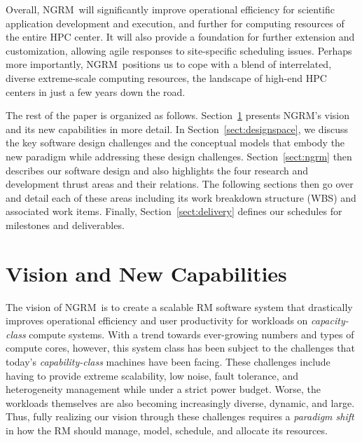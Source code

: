 \documentclass[10pt]{article}
\newcommand{\ngrm}{NGRM}
\begin{document}
Overall, \ngrm\ will significantly improve operational efficiency for
scientific application development and execution, and further for computing
resources of the entire HPC center.  It will also provide
a foundation for further extension and customization, allowing agile responses
to site-specific scheduling issues. Perhaps more importantly, \ngrm\
positions us to cope with a blend of interrelated, diverse
extreme-scale computing resources, the landscape of high-end HPC centers
in just a few years down the road.

The rest of the paper is organized as follows.
Section~\ref{sect:vision} presents \ngrm's vision and 
its new capabilities in more detail. 
In Section~\ref{sect:designspace}, we discuss 
the key software design challenges and the conceptual models
that embody the new paradigm while addressing these design challenges. 
Section~\ref{sect:ngrm} then describes our software design
and also highlights the four research and development thrust areas
and their relations. 
The following sections then go over and detail each of these areas including 
its work breakdown structure (WBS) and associated work items.
Finally, Section~\ref{sect:delivery} defines
our schedules for milestones and deliverables.


\section{Vision and New Capabilities}
\label{sect:vision}

The vision of \ngrm\ is to create a scalable RM software system that 
drastically improves operational efficiency and user productivity 
for workloads on {\em capacity-class} compute systems.
With a trend towards ever-growing numbers and types of compute cores, however,
this system class has been subject to the challenges that
today's {\em capability-class} machines have been facing. 
These challenges include having to provide extreme scalability, low noise, 
fault tolerance, and heterogeneity management while under a strict power budget.
Worse, the workloads themselves are also becoming increasingly diverse, 
dynamic, and large. Thus, fully realizing our vision through these challenges requires
a {\em paradigm shift} in how the RM should manage, model, schedule,
and allocate its resources.
\end{document}
